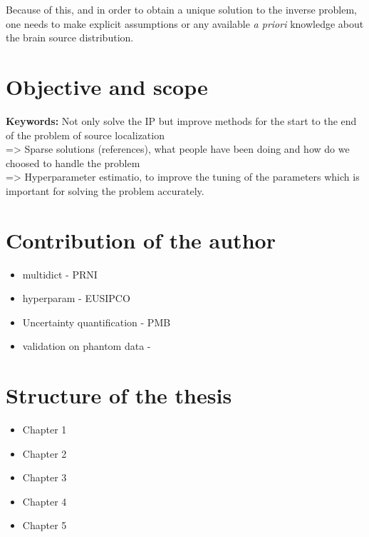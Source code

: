Because of this, and in order to obtain a unique solution to the inverse problem, one needs to make explicit assumptions or any available \textit{a priori} knowledge about the brain source distribution.

\section*{Objective and scope}
\textbf{Keywords:} Not only solve the IP but improve methods for the start to the end of the problem of source localization\\
=> Sparse solutions (references), what people have been doing and how do we choosed to handle the problem\\
=> Hyperparameter estimatio, to improve the tuning of the parameters which is important for solving the problem accurately.
\section*{Contribution of the author}
\begin{itemize}
\item multidict - PRNI
\item hyperparam - EUSIPCO
\item Uncertainty quantification - PMB
\item validation on phantom data - 
\end{itemize}

\section*{Structure of the thesis}
\begin{itemize}
\item Chapter 1
\item Chapter 2
\item Chapter 3
\item Chapter 4
\item Chapter 5
\end{itemize}


